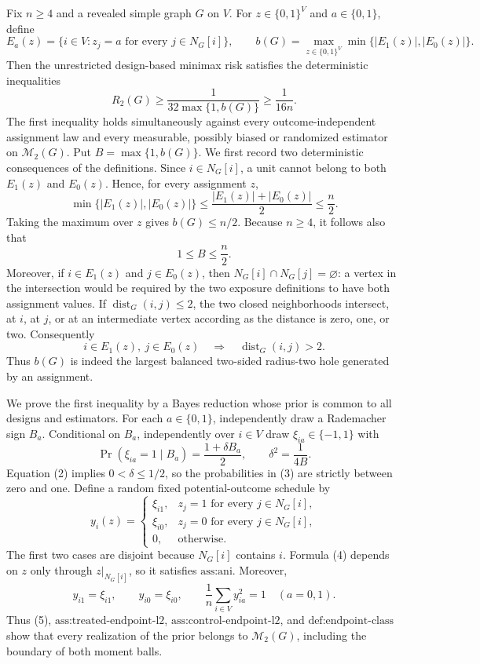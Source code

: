 Fix \(n\ge4\) and a revealed simple graph \(G\) on \(V\).  For \(z\in\{0,1\}^V\) and \(a\in\{0,1\}\), define
\[
E_a(z)=\{i\in V:z_j=a\text{ for every }j\in N_G[i]\},
\qquad
b(G)=\max_{z\in\{0,1\}^V}\min\{|E_1(z)|,|E_0(z)|\}.
\]
Then the unrestricted design-based minimax risk satisfies the deterministic inequalities
\[
R_2(G)\ge \frac{1}{32\max\{1,b(G)\}}\ge \frac{1}{16n}.
\]
The first inequality holds simultaneously against every outcome-independent assignment law and every measurable, possibly biased or randomized estimator on \(\mathcal M_2(G)\).
Put \(B=\max\{1,b(G)\}\).  We first record two deterministic consequences of the definitions.  Since \(i\in N_G[i]\), a unit cannot belong to both \(E_1(z)\) and \(E_0(z)\).  Hence, for every assignment \(z\),
\[
\min\{|E_1(z)|,|E_0(z)|\}
\le \frac{|E_1(z)|+|E_0(z)|}{2}
\le \frac n2. \tag{1}
\]
Taking the maximum over \(z\) gives \(b(G)\le n/2\).  Because \(n\ge4\), it follows also that
\[
1\le B\le \frac n2. \tag{2}
\]
Moreover, if \(i\in E_1(z)\) and \(j\in E_0(z)\), then \(N_G[i]\cap N_G[j]=\varnothing\): a vertex in the intersection would be required by the two exposure definitions to have both assignment values.  If \(\operatorname{dist}_G(i,j)\le2\), the two closed neighborhoods intersect, at \(i\), at \(j\), or at an intermediate vertex according as the distance is zero, one, or two.  Consequently
\[
i\in E_1(z),\ j\in E_0(z)
\quad\Longrightarrow\quad
\operatorname{dist}_G(i,j)>2. \tag{2a}
\]
Thus \(b(G)\) is indeed the largest balanced two-sided radius-two hole generated by an assignment.

We prove the first inequality by a Bayes reduction whose prior is common to all designs and estimators.  For each \(a\in\{0,1\}\), independently draw a Rademacher sign \(B_a\).  Conditional on \(B_a\), independently over \(i\in V\) draw \(\xi_{ia}\in\{-1,1\}\) with
\[
\Pr(\xi_{ia}=1\mid B_a)=\frac{1+\delta B_a}{2},
\qquad
\delta^2=\frac{1}{4B}. \tag{3}
\]
Equation (2) implies \(0<\delta\le1/2\), so the probabilities in (3) are strictly between zero and one.  Define a random fixed potential-outcome schedule by
\[
y_i(z)=
\begin{cases}
\xi_{i1},&z_j=1\text{ for every }j\in N_G[i],\\
\xi_{i0},&z_j=0\text{ for every }j\in N_G[i],\\
0,&\text{otherwise}.
\end{cases} \tag{4}
\]
The first two cases are disjoint because \(N_G[i]\) contains \(i\).  Formula (4) depends on \(z\) only through \(z|_{N_G[i]}\), so it satisfies \(\text{ass:ani}\).  Moreover,
\[
y_{i1}=\xi_{i1},\qquad y_{i0}=\xi_{i0},
\qquad
\frac1n\sum_{i\in V}y_{ia}^2=1\quad(a=0,1). \tag{5}
\]
Thus (5), \(\text{ass:treated-endpoint-l2}\), \(\text{ass:control-endpoint-l2}\), and \(\text{def:endpoint-class}\) show that every realization of the prior belongs to \(\mathcal M_2(G)\), including the boundary of both moment balls.

